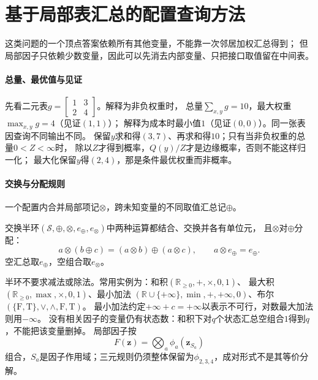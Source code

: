\section{基于局部表汇总的配置查询方法}
\label{sec:graph-theory-semiring-dynamic-programming}

这类问题的一个顶点答案依赖所有其他变量，不能靠一次邻居加权汇总得到；
但局部因子只依赖少数变量，因此可以先消去内部变量、只把接口取值留在中间表。

\paragraph{总量、最优值与见证}
先看二元表$g=\begin{bmatrix}1&3\\2&4\end{bmatrix}$。解释为非负权重时，
总量$\sum_{x,y}g=10$，最大权重$\max_{x,y}g=4$（见证$(1,1)$）；
解释为成本时最小值$1$（见证$(0,0)$）。同一张表因查询不同输出不同。
保留$y$求和得$(3,7)$、再求和得$10$；只有当非负权重的总量$0<Z<\infty$时，
除以$Z$才得到概率，$Q(y)/Z$才是边缘概率，否则不能这样归一化；
最大化保留$y$得$(2,4)$，那是条件最优权重而非概率。

\paragraph{交换与分配规则}
一个配置内合并局部项记$\otimes$，跨未知变量的不同取值汇总记$\oplus$。
\begin{definition}[交换半环]
  \label{def:graph-theory-semiring}
  交换半环$(\mathcal S,\oplus,\otimes,e_\oplus,e_\otimes)$中两种运算都结合、交换并各有单位元，
  且$\otimes$对$\oplus$分配：
  \[
    a\otimes(b\oplus c)=(a\otimes b)\oplus(a\otimes c),\qquad a\otimes e_\oplus=e_\oplus.
  \]
  空汇总取$e_\oplus$，空组合取$e_\otimes$。
\end{definition}
半环不要求减法或除法。常用实例为：和积$(\mathbb R_{\geq0},+,\times,0,1)$、
最大积$(\mathbb R_{\geq0},\max,\times,0,1)$、最小加法
$(\mathbb R\cup\{+\infty\},\min,+,+\infty,0)$、布尔$(\{\mathrm F,\mathrm T\},\lor,\land,\mathrm F,\mathrm T)$。
最小加法约定$+\infty+c=+\infty$以表示不可行，对数最大加法则用$-\infty$。
没有相关因子的变量仍有状态数：和积下对$q$个状态汇总空组合$1$得到$q$，不能把该变量删掉。
局部因子按
\begin{equation}
  F(\bm z)=\bigotimes_a\phi_a(\bm z_{S_a})
  \label{eq:graph-theory-factorized-objective}
\end{equation}
组合，$S_a$是因子作用域；三元规则仍须整体保留为$\phi_{2,3,4}$，成对形式不是其等价分解。

